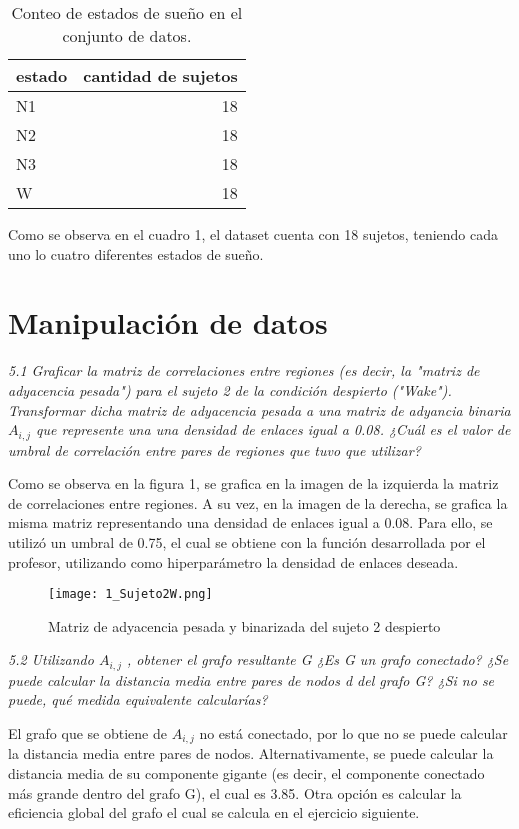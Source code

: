 \documentclass{article}
\begin{document}
\begin{table}[h]
  \centering
  \caption{Conteo de estados de sueño en el conjunto de datos.}
  \label{tab:estados_sueno}
  \begin{tabular}{lr}
    \toprule
    estado & cantidad de sujetos \\
    \midrule
    N1 & 18 \\
    N2 & 18 \\
    N3 & 18 \\
    W & 18 \\
    \bottomrule
  \end{tabular}
\end{table}

Como se observa en el cuadro 1, el dataset cuenta con 18 sujetos, teniendo cada uno lo
cuatro diferentes estados de sueño.

\section{Manipulación de datos}

\textit{5.1 Graﬁcar la matriz de correlaciones entre regiones (es decir, la "matriz de adyacencia
pesada") para el sujeto 2 de la condición despierto ("Wake"). Transformar dicha matriz de adyacencia pesada a una matriz de adyancia binaria $A_{i,j}$
que represente una una densidad de enlaces igual a 0.08. ¿Cuál es el valor de umbral de correlación entre pares de regiones que tuvo que utilizar?}

Como se observa en la figura 1, se grafica en la imagen de la izquierda la matriz de
correlaciones entre regiones. A su vez, en la imagen de la derecha, se grafica la misma
matriz representando una densidad de enlaces igual a 0.08. Para ello, se utilizó un umbral
de 0.75, el cual se obtiene con la función desarrollada por el profesor, utilizando como
hiperparámetro la densidad de enlaces deseada.

\begin{figure}[H]
  \centering  
  \texttt{[image: 1\_Sujeto2W.png]}
  \caption{Matriz de adyacencia pesada y binarizada del sujeto 2 despierto}
\end{figure}


\textit{5.2 Utilizando $A_{i,j}$ , obtener el grafo resultante G ¿Es G un grafo conectado? ¿Se puede calcular la distancia media entre pares de nodos
d del grafo G? ¿Si no se puede, qué medida equivalente calcularías?}

El grafo que se obtiene de $A_{i,j}$ no está conectado, por lo que no se puede calcular
la distancia media entre pares de nodos. Alternativamente, se puede calcular la distancia media de su
componente gigante (es decir, el componente conectado más grande dentro del grafo G),
el cual es 3.85. Otra opción es calcular la eficiencia global del grafo el cual se calcula en el ejercicio
 siguiente.
\end{document}
